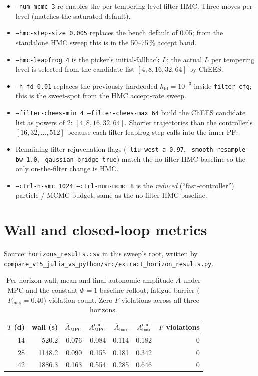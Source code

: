 \documentclass[11pt,a4paper]{article}
\begin{document}
\begin{itemize}[itemsep=2pt]
  \item \texttt{--num-mcmc 3} re-enables the per-tempering-level
        filter HMC. Three moves per level (matches the saturated
        default).
  \item \texttt{--hmc-step-size 0.005} replaces the bench default of
        0.05; from the standalone HMC sweep this is in the
        50--75\,\% accept band.
  \item \texttt{--hmc-leapfrog 4} is the picker's initial-fallback
        $L$; the actual $L$ per tempering level is selected from
        the candidate list $[4, 8, 16, 32, 64]$ by ChEES.
  \item \texttt{--h-fd 0.01} replaces the previously-hardcoded
        $h_{\mathrm{fd}}=10^{-3}$ inside \texttt{filter\_cfg}; this
        is the sweet-spot from the HMC accept-rate sweep.
  \item \texttt{--filter-chees-min 4 --filter-chees-max 64} build
        the ChEES candidate list as powers of 2:
        $[4, 8, 16, 32, 64]$. Shorter trajectories than the
        controller's $[16, 32, \ldots, 512]$ because each filter
        leapfrog step calls into the inner PF.
  \item Remaining filter rejuvenation flags (\texttt{--liu-west-a
        0.97}, \texttt{--smooth-resample-bw 1.0},
        \texttt{--gaussian-bridge true}) match the no-filter-HMC
        baseline so the only on-the-filter change is HMC.
  \item \texttt{--ctrl-n-smc 1024 --ctrl-num-mcmc 8} is the
        \emph{reduced} (``fast-controller'') particle / MCMC budget,
        same as the no-filter-HMC baseline.
\end{itemize}


\section{Wall and closed-loop metrics}
\label{sec:wall}

Source: \texttt{horizons\_results.csv} in this sweep's root, written
by \texttt{compare\_v15\_julia\_vs\_python/src/extract\_horizon\_results.py}.

\begin{table}[ht]
\centering
\small
\begin{tabular}{rrrrrrr}
\toprule
$T$ (d) & wall (s) & $\overline{A}_{\mathrm{MPC}}$ &
$A^{\mathrm{end}}_{\mathrm{MPC}}$ &
$\overline{A}_{\mathrm{base}}$ &
$A^{\mathrm{end}}_{\mathrm{base}}$ & $F$ violations \\
\midrule
14 & 520.2  & 0.076 & 0.084 & 0.114 & 0.182 & 0 \\
28 & 1148.2 & 0.090 & 0.155 & 0.181 & 0.342 & 0 \\
42 & 1886.3 & 0.163 & 0.554 & 0.285 & 0.646 & 0 \\
\bottomrule
\end{tabular}
\caption{Per-horizon wall, mean and final autonomic amplitude $A$
under MPC and the constant-$\Phi=1$ baseline rollout, fatigue-barrier
($F_{\max}=0.40$) violation count. Zero $F$ violations across all
three horizons.}
\label{tab:wall}
\end{table}
\end{document}
